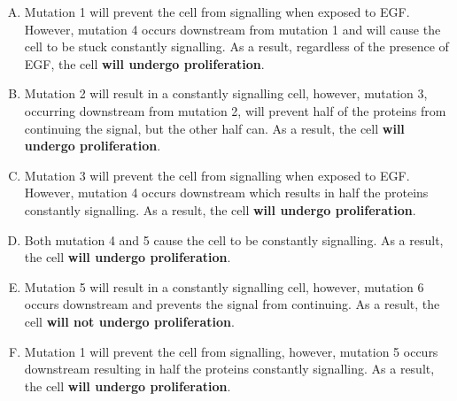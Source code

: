 \documentclass{article}
\begin{document}
\begin{enumerate}[A.]
    \item Mutation 1 will prevent the cell from signalling when exposed to EGF.
        However, mutation 4 occurs downstream from mutation 1 and will cause the
        cell to be stuck constantly signalling. As a result, regardless of the
        presence of EGF, the cell \textbf{will undergo proliferation}. 
    \item Mutation 2 will result in a constantly signalling cell, however,
        mutation 3, occurring downstream from mutation 2, will prevent half of
        the proteins from continuing the signal, but the other half can. As a
        result, the cell \textbf{will undergo proliferation}.
    \item Mutation 3 will prevent the cell from signalling when exposed to EGF.
        However, mutation 4 occurs downstream which results in half the proteins
        constantly signalling. As a result, the cell \textbf{will undergo
        proliferation}.
    \item Both mutation 4 and 5 cause the cell to be constantly signalling. As a
        result, the cell \textbf{will undergo proliferation}.
    \item Mutation 5 will result in a constantly signalling cell, however,
        mutation 6 occurs downstream and prevents the signal from continuing. As
        a result, the cell \textbf{will not undergo proliferation}.
    \item Mutation 1 will prevent the cell from signalling, however, mutation 5
        occurs downstream resulting in half the proteins constantly signalling.
        As a result, the cell \textbf{will undergo proliferation}.
\end{enumerate}
\end{document}
